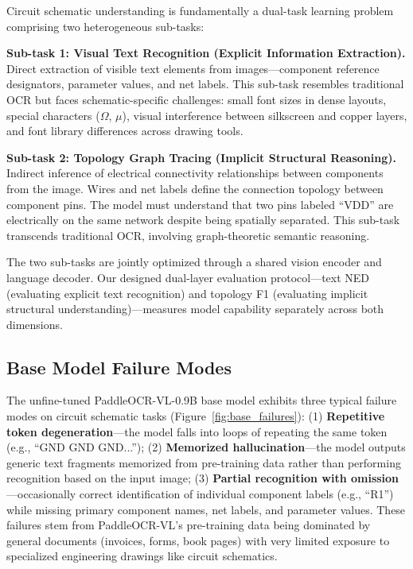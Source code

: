Circuit schematic understanding is fundamentally a dual-task learning problem comprising two heterogeneous sub-tasks:

\textbf{Sub-task 1: Visual Text Recognition (Explicit Information Extraction).} Direct extraction of visible text elements from images---component reference designators, parameter values, and net labels. This sub-task resembles traditional OCR but faces schematic-specific challenges: small font sizes in dense layouts, special characters ($\Omega$, $\mu$), visual interference between silkscreen and copper layers, and font library differences across drawing tools.

\textbf{Sub-task 2: Topology Graph Tracing (Implicit Structural Reasoning).} Indirect inference of electrical connectivity relationships between components from the image. Wires and net labels define the connection topology between component pins. The model must understand that two pins labeled ``VDD'' are electrically on the same network despite being spatially separated. This sub-task transcends traditional OCR, involving graph-theoretic semantic reasoning.

The two sub-tasks are jointly optimized through a shared vision encoder and language decoder. Our designed dual-layer evaluation protocol---text NED (evaluating explicit text recognition) and topology F1 (evaluating implicit structural understanding)---measures model capability separately across both dimensions.

\subsection{Base Model Failure Modes}

The unfine-tuned PaddleOCR-VL-0.9B base model exhibits three typical failure modes on circuit schematic tasks (Figure~\ref{fig:base_failures}): (1) \textbf{Repetitive token degeneration}---the model falls into loops of repeating the same token (e.g., ``GND GND GND...''); (2) \textbf{Memorized hallucination}---the model outputs generic text fragments memorized from pre-training data rather than performing recognition based on the input image; (3) \textbf{Partial recognition with omission}---occasionally correct identification of individual component labels (e.g., ``R1'') while missing primary component names, net labels, and parameter values. These failures stem from PaddleOCR-VL's pre-training data being dominated by general documents (invoices, forms, book pages) with very limited exposure to specialized engineering drawings like circuit schematics.

